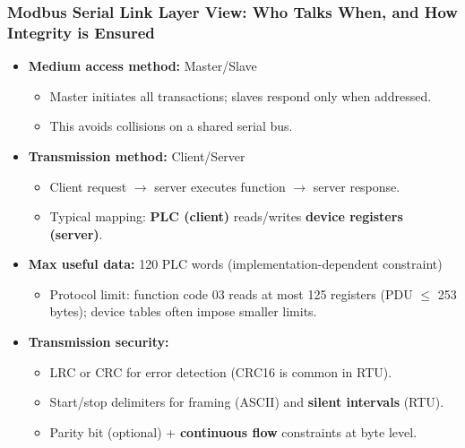 \begin{frame}
	\frametitle{Modbus Serial Link Layer View: Who Talks When, and How Integrity is Ensured}
	\begin{itemize}
		\item \textbf{Medium access method:} \alert{Master/Slave}
		\begin{itemize}
			\item Master initiates all transactions; slaves respond only when addressed.
			\item This avoids collisions on a shared serial bus.
		\end{itemize}
		\item \textbf{Transmission method:} \alert{Client/Server}
		\begin{itemize}
			\item Client request $\rightarrow$ server executes function $\rightarrow$ server response.
			\item Typical mapping: \textbf{PLC (client)} reads/writes \textbf{device registers (server)}.
		\end{itemize}
		\item \textbf{Max useful data:} \alert{120 PLC words} (implementation-dependent constraint)
		\begin{itemize}
			\item Protocol limit: function code 03 reads at most 125 registers (PDU $\leq$ 253 bytes); device tables often impose smaller limits.
		\end{itemize}
		\item \textbf{Transmission security:}
		\begin{itemize}
			\item \alert{LRC or CRC} for error detection (CRC16 is common in RTU).
			\item \alert{Start/stop delimiters} for framing (ASCII) and \textbf{silent intervals} (RTU).
			\item \alert{Parity bit} (optional) + \textbf{continuous flow} constraints at byte level.
		\end{itemize}
	\end{itemize}
\end{frame}


